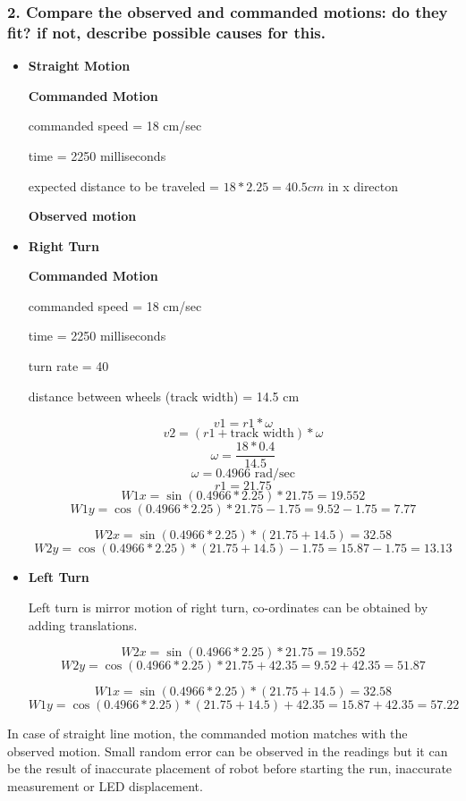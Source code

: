 \documentclass[11pt,a4paper,openright,twoside]{extreport}
\begin{document}
\subsubsection*{2. Compare the observed and commanded motions: do they fit? if not, describe possible causes for this.}
\begin{itemize}
	\item \textbf{Straight Motion}
	
	\textbf{Commanded Motion}
	
	commanded speed = 18 cm/sec
	
	time = 2250 milliseconds
	
	expected distance to be traveled = $ 18 * 2.25 = 40.5 cm $ in x directon
	
	
	\textbf{Observed motion}
	
	
	\item \textbf{Right Turn}
	
	\textbf{Commanded Motion}
		
	commanded speed = 18 cm/sec
	
	time = 2250 milliseconds
	
	turn rate = 40
	
	distance between wheels (track width) = 14.5 cm 

		$$v1 = r1 * \omega$$
		$$v2 = (r1 + \text{track width} ) * \omega$$
		$$\omega = \frac{18 * 0.4}{14.5}$$
		$$\omega = 0.4966 \text{ rad/sec}$$
		$$r1 = 21.75$$
		$$W1x = \sin(0.4966 * 2.25) * 21.75 = 19.552 $$
		$$W1y = \cos(0.4966 * 2.25) * 21.75 - 1.75 = 9.52 - 1.75 = 7.77$$
	
		$$W2x = \sin(0.4966 * 2.25) * (21.75 + 14.5) = 32.58$$
		$$W2y = \cos(0.4966 * 2.25) * (21.75 + 14.5) - 1.75 = 15.87 - 1.75 = 13.13$$

	\item \textbf{Left Turn}
	
	Left turn is mirror motion of right turn, co-ordinates can be obtained by adding translations. 
	
	$$W2x = \sin(0.4966 * 2.25) * 21.75 = 19.552 $$
	$$W2y = \cos(0.4966 * 2.25) * 21.75 + 42.35 = 9.52 + 42.35 = 51.87$$
	
	$$W1x = \sin(0.4966 * 2.25) * (21.75 + 14.5) = 32.58$$
	$$W1y = \cos(0.4966 * 2.25) * (21.75 + 14.5) + 42.35 = 15.87 + 42.35 = 57.22$$
	
	
\end{itemize}

In case of straight line motion, the commanded motion matches with the observed motion. Small random error can be observed in the readings but it can be the result of inaccurate placement of robot before starting the run, inaccurate measurement or LED displacement. 
\end{document}
